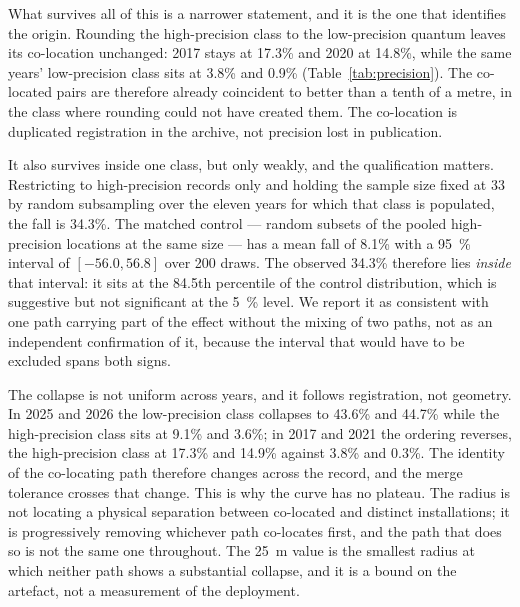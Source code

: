 \documentclass{article}
\begin{document}
What survives all of this is a narrower statement, and it is the one that identifies the origin.
Rounding the high-precision class to the low-precision quantum leaves its co-location unchanged:
2017 stays at \num{17.3}\% and 2020 at \num{14.8}\%, while the same years' low-precision class
sits at \num{3.8}\% and \num{0.9}\% (Table~\ref{tab:precision}). The co-located pairs are
therefore already coincident to better than a tenth of a metre, in the class where rounding could
not have created them. The co-location is duplicated registration in the archive, not
precision lost in publication.

It also survives inside one class, but only weakly, and the qualification matters. Restricting to
high-precision records only and holding the sample size fixed at \num{33} by random subsampling
over the eleven years for which that class is populated, the fall is \num{34.3}\%. The matched
control --- random subsets of the pooled high-precision locations at the same size --- has a mean
fall of \num{8.1}\% with a \SI{95}{\percent} interval of $[-56.0, 56.8]$ over \num{200} draws.
The observed \num{34.3}\% therefore lies \emph{inside} that interval: it sits at the
\num{84.5}th percentile of the control distribution, which is suggestive but not significant at
the \SI{5}{\percent} level. We report it as consistent with one path carrying part of the effect
without the mixing of two paths, not as an independent confirmation of it, because the interval
that would have to be excluded spans both signs.

The collapse is not uniform across years, and it follows registration, not geometry. In
2025 and 2026 the low-precision class collapses to \num{43.6}\% and \num{44.7}\% while the
high-precision class sits at \num{9.1}\% and \num{3.6}\%; in 2017 and 2021 the ordering reverses,
the high-precision class at \num{17.3}\% and \num{14.9}\% against \num{3.8}\% and \num{0.3}\%.
The identity of the co-locating path therefore changes across the record, and the merge tolerance
crosses that change. This is why the curve has no plateau. The radius is not locating a physical
separation between co-located and distinct installations; it is progressively removing whichever
path co-locates first, and the path that does so is not the same one throughout. The
\SI{25}{\meter} value is the smallest radius at which neither path shows a substantial collapse,
and it is a bound on the artefact, not a measurement of the deployment.
\end{document}
